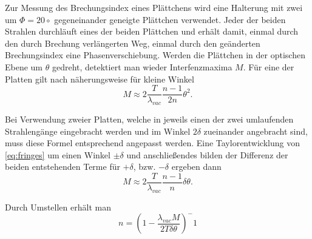 Zur Messung des Brechungsindex eines Plättchens wird eine Halterung mit zwei um $\Phi = 20\circ$ gegeneinander geneigte Plättchen verwendet. Jeder der beiden Strahlen durchläuft eines der beiden Plättchen und erhält damit, einmal durch den durch Brechung verlängerten Weg, einmal durch den geänderten Brechungsindex eine Phasenverschiebung. Werden die Plättchen in der optischen Ebene um $\theta$ gedreht, detektiert man wieder Interfenzmaxima $M$.
Für eine der Platten gilt nach \cite{Anleitung} näherungsweise für kleine Winkel
\begin{equation}
	M \approx 2 \frac{T}{\lambda_{vac}} \frac{n-1}{2n} \theta^2.
  \label{eq:fringes}
\end{equation}

Bei Verwendung zweier Platten, welche in jeweils einen der zwei umlaufenden Strahlengänge eingebracht werden und im Winkel $2\delta$ zueinander angebracht sind, muss diese Formel entsprechend angepasst werden.
Eine Taylorentwicklung von \eqref{eq:fringes} um einen Winkel $\pm \delta$ und anschließendes bilden der Differenz der beiden entstehenden Terme für $+\delta$, bzw. $-\delta$ ergeben dann
\begin{equation}
  M \approx 2\frac{T}{\lambda_{vac}}\frac{n-1}{n} \delta \theta.
\end{equation}

Durch Umstellen erhält man
\begin{equation}
  n = \left(1-\frac{\lambda_{vac}M}{2T\delta \theta}\right)^-1
  \label{eq:index}
\end{equation}
